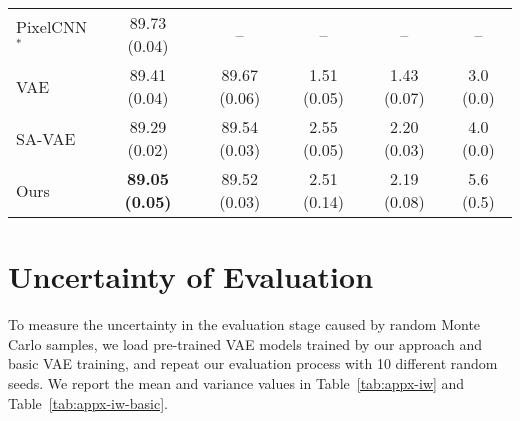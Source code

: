\documentclass{article} \usepackage{iclr2019_conference,times}
\begin{document}
\begin{table}[h]
{\begin{tabular}{lccccc}
    PixelCNN$^\ast$             &89.73 (0.04)        &--        &--    &--   &-- \\
    VAE                         &89.41 (0.04) &89.67 (0.06) &1.51 (0.05) & 1.43 (0.07)   &3.0 (0.0) \\
    SA-VAE                      &89.29 (0.02)  &89.54 (0.03)   &2.55 (0.05)   &2.20 (0.03) &4.0 (0.0)   \\
    Ours                        &\textbf{89.05 (0.05)}  &89.52 (0.03)  &2.51 (0.14)   &2.19 (0.08) &5.6 (0.5)   \\    
    \bottomrule
    \end{tabular}}
\end{table}

\section{Uncertainty of Evaluation}\label{apdix:iw}
To measure the uncertainty in the evaluation stage caused by random Monte Carlo samples, we load pre-trained VAE models trained by our approach and basic VAE training, and repeat our evaluation process with 10 different random seeds. We report the mean and variance values in Table~\ref{tab:appx-iw} and Table~\ref{tab:appx-iw-basic}.

\begin{table}[h]
    \centering
    \caption{Evaluation of a trained VAE model trained by our approach across 10 different random seeds. Mean values are reported and variance is given in parentheses. IW denotes the approximation to NLL we used in Section~\ref{sec:expresults}. }
    \label{tab:appx-iw}
\end{table}
\end{document}
